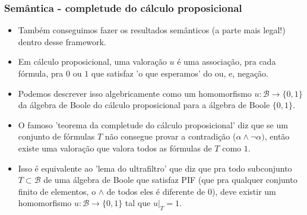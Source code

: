 \begin{frame}{}
\frametitle{Semântica - completude do cálculo proposicional}
\pause

\begin{itemize}
\item Também conseguimos fazer os resultados semânticos (a parte mais legal!) dentro desse framework. \pause

\item Em cálculo proposicional, uma valoração $u$ é uma associação, pra cada fórmula, pra $0$ ou $1$ que satisfaz 'o que esperamos' do ou, e, negação. \pause

\item Podemos descrever isso algebricamente como um homomorfismo $u: \mathcal{B} \rightarrow \{0,1\}$ da álgebra de Boole do cálculo proposicional para a álgebra de Boole $\{0,1\}$. \pause

\item O famoso 'teorema da completude do cálculo proposicional' diz que se um conjunto de fórmulas $T$ não consegue provar a contradição ($\alpha \wedge \lnot \alpha)$, então existe uma valoração que valora todos as fórmulas de $T$ como $1$. \pause

\item Isso é equivalente ao 'lema do ultrafiltro' que diz que pra todo subconjunto $T \subset \mathcal{B}$ de uma álgebra de Boole que satisfaz PIF (que pra qualquer conjunto finito de elementos, o $\wedge$ de todos eles é diferente de $0$), deve existir um homomorfismo $u: \mathcal{B} \rightarrow \{0,1\}$ tal que $u|_{T} = 1$. 
\end{itemize}

\end{frame}

